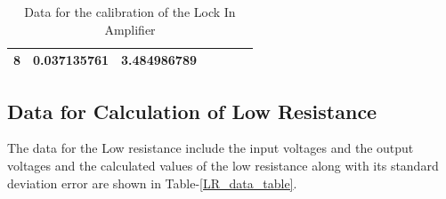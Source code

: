 \documentclass{article}
\begin{document}
\begin{multicols}{2}
\begin{table}
{\begin{tabular}{|c|cc|cc|cc|}
    8                                 & \multicolumn{1}{c|}{0.037135761}           & 3.484986789            & \multicolumn{1}{c|}{}                      &                        & \multicolumn{1}{c|}{}                      &                        \\ \hline
    \end{tabular}%
    }
    \caption{Data for the calibration of the Lock In Amplifier}
    \label{CAL_data_table}
\end{table}




\subsection{Data for Calculation of Low Resistance}
The data for the Low resistance include the input voltages and the output voltages and the calculated values of the low resistance along with its standard deviation error are shown in Table-\ref{LR_data_table}.



\begin{table}[H]
    \centering
    \caption{Data for the Calculation of Low resistance}
    \label{LR_data_table}
\end{table}


\end{multicols}
\end{document}
